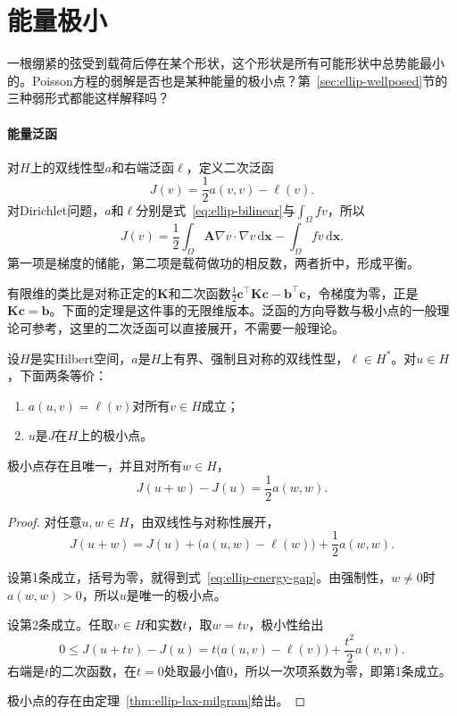 \section{能量极小}
\label{sec:ellip-energy}

一根绷紧的弦受到载荷后停在某个形状，这个形状是所有可能形状中总势能最小的。Poisson方程的弱解是否也是某种能量的极小点？第~\ref{sec:ellip-wellposed}节的三种弱形式都能这样解释吗？

\paragraph{能量泛函}
对$H$上的双线性型$a$和右端泛函$\ell$，定义二次泛函
\begin{equation}
 J(v)=\frac12a(v,v)-\ell(v).
 \label{eq:ellip-energy}
\end{equation}
对Dirichlet问题，$a$和$\ell$分别是式~\eqref{eq:ellip-bilinear}与$\int_\Omega fv$，所以
\[
 J(v)=\frac12\int_\Omega\bm{A}\nabla v\cdot\nabla v\,\mathrm{d}\bm{x}-\int_\Omega fv\,\mathrm{d}\bm{x} .
\]
第一项是梯度的储能，第二项是载荷做功的相反数，两者折中，形成平衡。

有限维的类比是对称正定的$\bm{K}$和二次函数$\frac12\bm{c}^\top\bm{K}\bm{c}-\bm{b}^\top\bm{c}$，令梯度为零，正是$\bm{K}\bm{c}=\bm{b}$。下面的定理是这件事的无限维版本。泛函的方向导数与极小点的一般理论可参考，这里的二次泛函可以直接展开，不需要一般理论。

\begin{theorem}[弱解是能量的唯一极小点]
\label{thm:ellip-energy}
设$H$是实Hilbert空间，$a$是$H$上有界、强制且对称的双线性型，$\ell\in H^*$。对$u\in H$，下面两条等价：
\begin{enumerate}
 \item $a(u,v)=\ell(v)$对所有$v\in H$成立；
 \item $u$是$J$在$H$上的极小点。
\end{enumerate}
极小点存在且唯一，并且对所有$w\in H$，
\begin{equation}
 J(u+w)-J(u)=\frac12a(w,w).
 \label{eq:ellip-energy-gap}
\end{equation}
\end{theorem}

\begin{proof}
对任意$u,w\in H$，由双线性与对称性展开，
\[
 J(u+w)=J(u)+\bigl(a(u,w)-\ell(w)\bigr)+\frac12a(w,w).
\]

设第1条成立，括号为零，就得到式~\eqref{eq:ellip-energy-gap}。由强制性，$w\neq0$时$a(w,w)>0$，所以$u$是唯一的极小点。

设第2条成立。任取$v\in H$和实数$t$，取$w=tv$，极小性给出
\[
 0\leq J(u+tv)-J(u)=t\bigl(a(u,v)-\ell(v)\bigr)+\frac{t^2}2a(v,v).
\]
右端是$t$的二次函数，在$t=0$处取最小值$0$，所以一次项系数为零，即第1条成立。

极小点的存在由定理~\ref{thm:ellip-lax-milgram}给出。
\end{proof}

